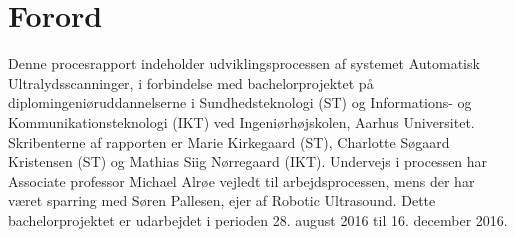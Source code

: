 \chapter{Forord}\label{kapForord}
Denne procesrapport indeholder udviklingsprocessen af systemet Automatisk Ultralydsscanninger, i forbindelse med bachelorprojektet på diplomingeniøruddannelserne i Sundhedsteknologi (ST) og Informations- og Kommunikationsteknologi (IKT) ved Ingeniørhøjskolen, Aarhus Universitet. Skribenterne af rapporten er Marie Kirkegaard (ST), Charlotte Søgaard Kristensen (ST) og Mathias Siig Nørregaard (IKT). Undervejs i processen har Associate professor Michael Alrøe vejledt til arbejdsprocessen, mens der har været sparring med Søren Pallesen, ejer af Robotic Ultrasound. Dette bachelorprojektet er udarbejdet i perioden 28. august 2016 til 16. december 2016.
